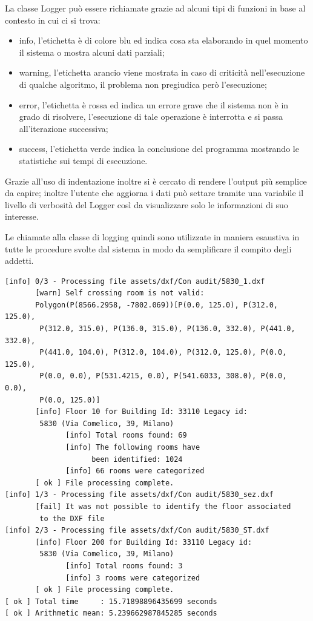 \documentclass[12pt]{report}
\begin{document}
La classe Logger può essere richiamate grazie ad alcuni tipi di funzioni in base al contesto in cui ci si trova:
\begin{itemize}
\item info, l'etichetta è di colore blu ed indica cosa sta elaborando in quel momento il sistema o mostra alcuni dati parziali;
\item warning, l'etichetta arancio viene mostrata in caso di criticità nell'esecuzione di qualche algoritmo, il problema non pregiudica però l'esecuzione;
\item error, l'etichetta è rossa ed indica un errore grave che il sistema non è in grado di risolvere, l'esecuzione di tale operazione è interrotta e si passa all'iterazione successiva;
\item success, l'etichetta verde indica la conclusione del programma mostrando le statistiche sui tempi di esecuzione.
\end{itemize}    

\vspace{5mm} %

Grazie all'uso di indentazione inoltre si è cercato di rendere l'output più semplice da capire; inoltre l'utente che aggiorna i dati può settare tramite una variabile il livello di verbosità del Logger così da visualizzare solo le informazioni di suo interesse.

Le chiamate alla classe di logging quindi sono utilizzate in maniera esaustiva in tutte le procedure svolte dal sistema in modo da semplificare il compito degli addetti.

\begin{lstlisting}[label=codice,caption=Esempio di output del Logger nel processamento di file DXF, frame=single]
[info] 0/3 - Processing file assets/dxf/Con audit/5830_1.dxf
       [warn] Self crossing room is not valid: 
       Polygon(P(8566.2958, -7802.069))[P(0.0, 125.0), P(312.0, 125.0), 
       	P(312.0, 315.0), P(136.0, 315.0), P(136.0, 332.0), P(441.0, 332.0), 
       	P(441.0, 104.0), P(312.0, 104.0), P(312.0, 125.0), P(0.0, 125.0), 
       	P(0.0, 0.0), P(531.4215, 0.0), P(541.6033, 308.0), P(0.0, 0.0), 
       	P(0.0, 125.0)]
       [info] Floor 10 for Building Id: 33110 Legacy id: 
       	5830 (Via Comelico, 39, Milano)
              [info] Total rooms found: 69
              [info] The following rooms have 
              		been identified: 1024
              [info] 66 rooms were categorized
       [ ok ] File processing complete.
[info] 1/3 - Processing file assets/dxf/Con audit/5830_sez.dxf
       [fail] It was not possible to identify the floor associated 
       	to the DXF file
[info] 2/3 - Processing file assets/dxf/Con audit/5830_ST.dxf
       [info] Floor 200 for Building Id: 33110 Legacy id: 
       	5830 (Via Comelico, 39, Milano)
              [info] Total rooms found: 3
              [info] 3 rooms were categorized
       [ ok ] File processing complete.
[ ok ] Total time     : 15.71898896435699 seconds
[ ok ] Arithmetic mean: 5.239662987845285 seconds

\end{lstlisting}
\end{document}

